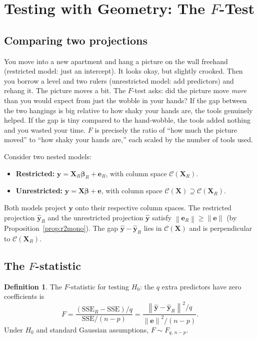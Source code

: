 \documentclass[11pt,a4paper]{article}
\theoremstyle{plain}
\theoremstyle{definition}
\newtheorem{definition}[theorem]{Definition}
\newcommand{\yhat}{\hat{\bm{y}}}
\newcommand{\bX}{\bm{X}}
\newcommand{\by}{\bm{y}}
\newcommand{\be}{\bm{e}}
\newcommand{\Col}{\mathcal{C}}
\newcommand{\norm}[1]{\left\lVert #1 \right\rVert}
\begin{document}
\section{Testing with Geometry: The $F$-Test}\label{sec:ftest}

\subsection{Comparing two projections}

\begin{toystory}
You move into a new apartment and hang a picture on the wall freehand
(restricted model: just an intercept).  It looks okay, but slightly
crooked.  Then you borrow a level and two rulers (unrestricted model:
add predictors) and rehang it.  The picture moves a bit.  The $F$-test
asks: did the picture move \emph{more} than you would expect from just
the wobble in your hands?  If the gap between the two hangings is big
relative to how shaky your hands are, the tools genuinely helped.  If
the gap is tiny compared to the hand-wobble, the tools added nothing
and you wasted your time.  $F$ is precisely the ratio of ``how much the
picture moved'' to ``how shaky your hands are,'' each scaled by the
number of tools used.
\end{toystory}

Consider two nested models:
\begin{itemize}[nosep]
  \item \textbf{Restricted:} $\by = \bX_R\bm{\beta}_R + \be_R$,
        with column space $\Col(\bX_R)$.
  \item \textbf{Unrestricted:} $\by = \bX\bm{\beta} + \be$,
        with column space $\Col(\bX)\supseteq\Col(\bX_R)$.
\end{itemize}
Both models project $\by$ onto their respective column spaces.
The restricted projection $\yhat_R$ and the unrestricted projection
$\yhat$ satisfy $\norm{\be_R}\ge\norm{\be}$ (by Proposition~\ref{prop:r2mono}).
The gap $\yhat - \yhat_R$ lies in $\Col(\bX)$ and is perpendicular to
$\Col(\bX_R)$.

\subsection{The $F$-statistic}

\begin{definition}
The $F$-statistic for testing $H_0$: the $q$ extra predictors
have zero coefficients is
\begin{equation}\label{eq:fstat}
  F = \frac{(\text{SSE}_R - \text{SSE})/q}{\text{SSE}/(n-p)}
    = \frac{\norm{\yhat-\yhat_R}^2/q}{\norm{\be}^2/(n-p)}.
\end{equation}
Under $H_0$ and standard Gaussian assumptions,
$F\sim F_{q,\,n-p}$.
\end{definition}
\end{document}
